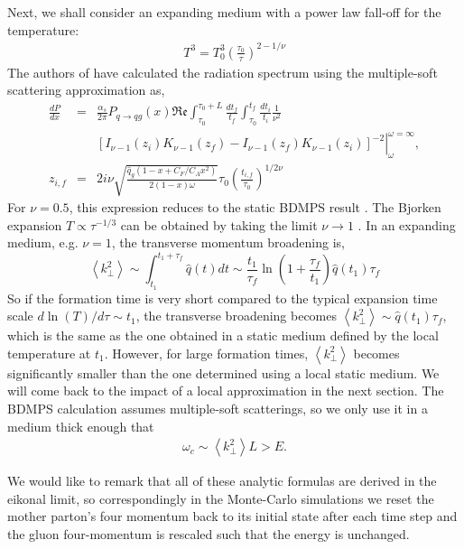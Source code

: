 \documentclass[aps, prc, reprint, amsmath, groupedaddress, nofootinbib]{revtex4-1}
\begin{document}
Next, we shall consider an expanding medium with a power law fall-off for the temperature: 
\begin{eqnarray}
T^3 = T_0^3\left(\frac{\tau_0}{\tau}\right)^{2-1/\nu}
\end{eqnarray}
The authors of \cite{Baier:1998yf} have calculated the radiation spectrum using the multiple-soft scattering approximation as,
\begin{eqnarray}
\frac{dP}{dx} &=& \frac{\alpha_s}{2\pi}P_{q\rightarrow qg}(x)\mathfrak{Re}\int_{\tau_0}^{\tau_0+L}\frac{dt_f}{t_f}\int_{\tau_0}^{t_f}\frac{dt_i}{t_i} \frac{1}{\nu^2}\\
\nonumber
&& \left.\left[ I_{\nu-1}(z_i)K_{\nu-1}(z_f)-I_{\nu-1}(z_f)K_{\nu-1}(z_i)\right]^{-2}\right|_{\omega}^{\omega=\infty},\\
z_{i,f} &=& 2i\nu \sqrt{\frac{\hat{q}_g(1-x+C_F/C_A x^2)}{2(1-x)\omega}} \tau_0 \left( \frac{t_{i,f}}{\tau_0}\right) ^{1/2\nu}
\end{eqnarray}
For $\nu=0.5$, this expression reduces to the static BDMPS result \cite{Baier:1996kr}. 
The Bjorken expansion $T \propto \tau^{-1/3}$ can be obtained by taking the limit $\nu \rightarrow 1$ \cite{PhysRevD.27.140}.
In an expanding medium, e.g. $\nu=1$, the transverse momentum broadening is,
\begin{equation}\label{eq:expanding-kt2}
\left\langle k_\perp^2\right\rangle \sim \int_{t_1}^{t_1+\tau_f
}\hat{q}(t)dt \sim \frac{t_1}{\tau_f}  \ln\left(1+\frac{\tau_f}{t_1}\right) \hat{q}(t_1)\tau_f
\end{equation}
So if the formation time is very short compared to the typical expansion time scale $d\ln(T)/d\tau \sim t_1$, the transverse broadening becomes $\left\langle k_\perp^2\right\rangle \sim \hat{q}(t_1)\tau_f$, which is the same as the one obtained in a static medium defined by the local temperature at $t_1$.
However, for large formation times, $\left\langle k_\perp^2\right\rangle$ becomes significantly smaller than the one determined using a local static medium.
We will come back to the impact of a local approximation in the next section. 
The BDMPS calculation assumes multiple-soft scatterings, so we only use it in a medium thick enough that
\begin{eqnarray}\label{eq:BDMPS-requrement}
\omega_c \sim \left\langle k_\perp^2 \right\rangle L > E.
\end{eqnarray}

We would like to remark that all of these analytic formulas are derived in the eikonal limit, so correspondingly in the Monte-Carlo simulations we reset the mother parton's four momentum back to its initial state after each time step and the gluon four-momentum is rescaled such that the energy is unchanged.
\end{document}
